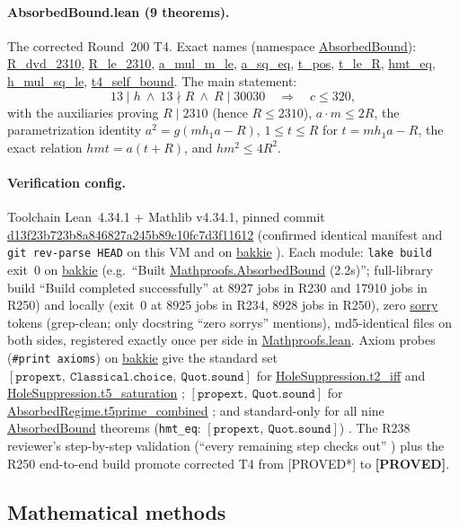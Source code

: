 \documentclass[11pt,a4paper]{article}
\theoremstyle{definition}
\begin{document}
\paragraph{AbsorbedBound.lean (9 theorems).} The corrected Round~200
T4. Exact names (namespace \url{AbsorbedBound}):
\url{R_dvd_2310}, \url{R_le_2310}, \url{a_mul_m_le},
\url{a_sq_eq}, \url{t_pos}, \url{t_le_R}, \url{hmt_eq},
\url{h_mul_sq_le}, \url{t4_self_bound}.
The main statement:
\begin{equation}
  \label{eq:t4corrected}
  13\mid h\ \land\ 13\nmid R\ \land\ R\mid30030
  \quad\Longrightarrow\quad c\le320,
\end{equation}
with the auxiliaries proving $R\mid2310$ (hence $R\le2310$),
$a\cdot m\le2R$, the parametrization identity $a^2=g(mh_1a-R)$,
$1\le t\le R$ for $t=mh_1a-R$, the exact relation
$hmt=a(t+R)$, and $hm^2\le4R^2$.

\paragraph{Verification config.} Toolchain Lean~4.34.1 + Mathlib
v4.34.1, pinned commit \url{d13f23b723b8a846827a245b89c10fc7d3f11612}
(confirmed identical manifest and \texttt{git rev-parse HEAD} on this
VM and on \url{bakkie} \cite{D250}). Each module: \texttt{lake
build} exit~0 on \url{bakkie} (e.g.\ ``Built
\url{Mathproofs.AbsorbedBound} (2.2s)''; full-library build
``Build completed successfully'' at 8927 jobs in R230 and 17910 jobs
in R250) and locally (exit~0 at 8925 jobs in R234, 8928 jobs in R250),
zero \url{sorry} tokens (grep-clean; only docstring ``zero sorrys''
mentions), md5-identical files on both sides, registered exactly once
per side in \url{Mathproofs.lean}. Axiom probes
(\texttt{\#print axioms}) on \url{bakkie} give the standard set
$[\texttt{propext},\ \texttt{Classical.choice},\ \texttt{Quot.sound}]$
for \url{HoleSuppression.t2_iff} and
\url{HoleSuppression.t5_saturation} \cite{D230};
$[\texttt{propext},\ \texttt{Quot.sound}]$ for
\url{AbsorbedRegime.t5prime_combined} \cite{D230}; and standard-only
for all nine \url{AbsorbedBound} theorems
(\texttt{hmt\_eq}: $[\texttt{propext},\ \texttt{Quot.sound}]$)
\cite{D250}. The R238 reviewer's step-by-step validation (``every
remaining step checks out'' \cite{D238}) plus the R250 end-to-end build
promote corrected T4 from [PROVED*] to \textbf{[PROVED]}.

\subsection{Mathematical methods}
\end{document}
